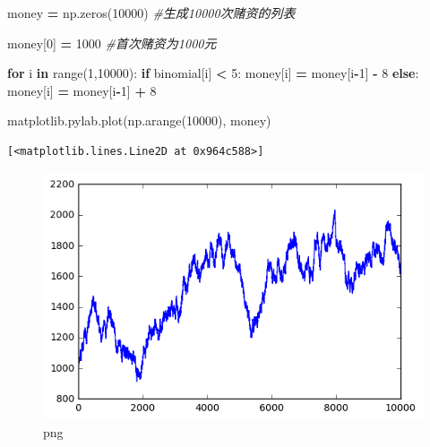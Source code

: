 \documentclass[]{article}
\newenvironment{Shaded}{\begin{snugshade}}{\end{snugshade}}
\newcommand{\KeywordTok}[1]{\textcolor[rgb]{0.13,0.29,0.53}{\textbf{#1}}}
\newcommand{\DecValTok}[1]{\textcolor[rgb]{0.00,0.00,0.81}{#1}}
\newcommand{\CommentTok}[1]{\textcolor[rgb]{0.56,0.35,0.01}{\textit{#1}}}
\newcommand{\ControlFlowTok}[1]{\textcolor[rgb]{0.13,0.29,0.53}{\textbf{#1}}}
\newcommand{\OperatorTok}[1]{\textcolor[rgb]{0.81,0.36,0.00}{\textbf{#1}}}
\newcommand{\BuiltInTok}[1]{#1}
\newcommand{\NormalTok}[1]{#1}
\begin{document}
\begin{Shaded}
\begin{Highlighting}[]
\NormalTok{money }\OperatorTok{=}\NormalTok{ np.zeros(}\DecValTok{10000}\NormalTok{) }\CommentTok{#生成10000次赌资的列表}
\end{Highlighting}
\end{Shaded}

\begin{Shaded}
\begin{Highlighting}[]
\NormalTok{money[}\DecValTok{0}\NormalTok{] }\OperatorTok{=} \DecValTok{1000} \CommentTok{#首次赌资为1000元}
\end{Highlighting}
\end{Shaded}

\begin{Shaded}
\begin{Highlighting}[]
\ControlFlowTok{for}\NormalTok{ i }\KeywordTok{in} \BuiltInTok{range}\NormalTok{(}\DecValTok{1}\NormalTok{,}\DecValTok{10000}\NormalTok{):}
    \ControlFlowTok{if}\NormalTok{ binomial[i] }\OperatorTok{<} \DecValTok{5}\NormalTok{:}
\NormalTok{        money[i] }\OperatorTok{=}\NormalTok{ money[i}\OperatorTok{-}\DecValTok{1}\NormalTok{] }\OperatorTok{-} \DecValTok{8}
    \ControlFlowTok{else}\NormalTok{:}
\NormalTok{        money[i] }\OperatorTok{=}\NormalTok{ money[i}\OperatorTok{-}\DecValTok{1}\NormalTok{] }\OperatorTok{+} \DecValTok{8}
\end{Highlighting}
\end{Shaded}

\begin{Shaded}
\begin{Highlighting}[]
\NormalTok{matplotlib.pylab.plot(np.arange(}\DecValTok{10000}\NormalTok{), money)}
\end{Highlighting}
\end{Shaded}

\begin{verbatim}
[<matplotlib.lines.Line2D at 0x964c588>]
\end{verbatim}

\begin{figure}
\centering
\includegraphics{output_207_1.png}
\caption{png}
\end{figure}
\end{document}

